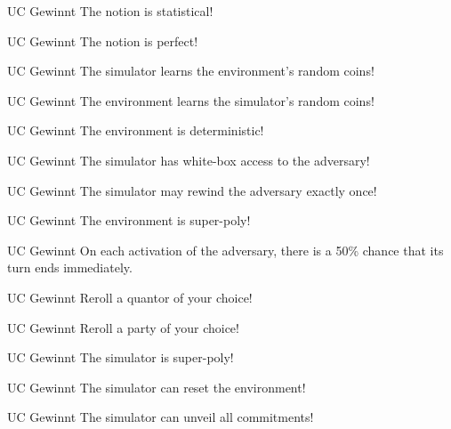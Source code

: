 \documentclass[avery5371,frame,grid]{flashcards}
\begin{document}
\begin{flashcard}{UC Gewinnt}
  The notion is statistical!
\end{flashcard}
\begin{flashcard}{UC Gewinnt}
  The notion is perfect!
\end{flashcard}
\begin{flashcard}{UC Gewinnt}
  The simulator learns the environment's random coins!
\end{flashcard}
\begin{flashcard}{UC Gewinnt}
  The environment learns the simulator's random coins!
\end{flashcard}
\begin{flashcard}{UC Gewinnt}
  The environment is deterministic!
\end{flashcard}
\begin{flashcard}{UC Gewinnt}
  The simulator has white-box access to the adversary!
\end{flashcard}
\begin{flashcard}{UC Gewinnt}
  The simulator may rewind the adversary exactly once!
\end{flashcard}
\begin{flashcard}{UC Gewinnt}
  The environment is super-poly!
\end{flashcard}
\begin{flashcard}{UC Gewinnt}
  On each activation of the adversary, there is a 50\% chance that its turn ends immediately. 
\end{flashcard}
\begin{flashcard}{UC Gewinnt}
  Reroll a quantor of your choice!
\end{flashcard}
\begin{flashcard}{UC Gewinnt}
  Reroll a party of your choice!
\end{flashcard}
\begin{flashcard}{UC Gewinnt}
  The simulator is super-poly!
\end{flashcard}
\begin{flashcard}{UC Gewinnt}
  The simulator can reset the environment!
\end{flashcard}
\begin{flashcard}{UC Gewinnt}
  The simulator can unveil all commitments!
\end{flashcard}

\end{document}
